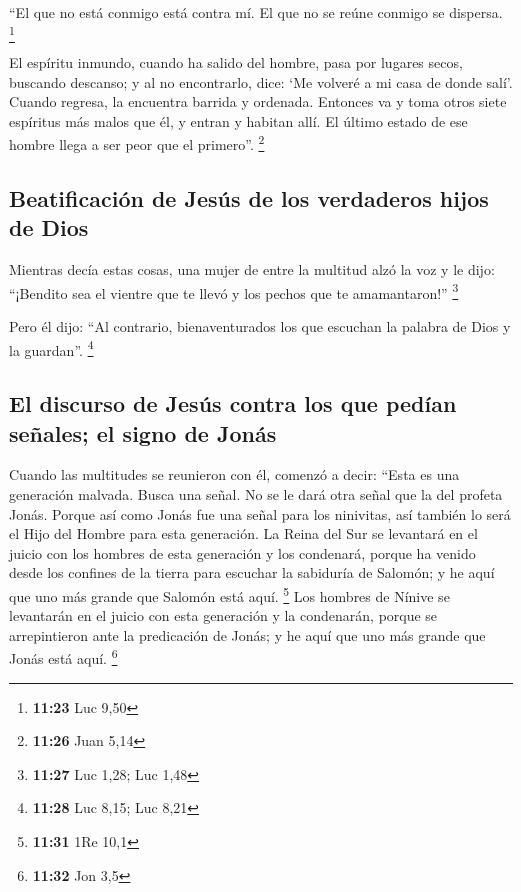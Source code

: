  ``El que no está conmigo está contra mí. El que no se
reúne conmigo se dispersa. \footnote{\textbf{11:23} Luc 9,50}

 El espíritu inmundo, cuando ha salido del hombre, pasa
por lugares secos, buscando descanso; y al no encontrarlo, dice: `Me
volveré a mi casa de donde salí'.  Cuando regresa, la
encuentra barrida y ordenada.  Entonces va y toma otros
siete espíritus más malos que él, y entran y habitan allí. El último
estado de ese hombre llega a ser peor que el primero''. \footnote{\textbf{11:26}
  Juan 5,14}

\hypertarget{beatificaciuxf3n-de-jesuxfas-de-los-verdaderos-hijos-de-dios}{%
\subsection{Beatificación de Jesús de los verdaderos hijos de
Dios}\label{beatificaciuxf3n-de-jesuxfas-de-los-verdaderos-hijos-de-dios}}

 Mientras decía estas cosas, una mujer de entre la
multitud alzó la voz y le dijo: ``¡Bendito sea el vientre que te llevó y
los pechos que te amamantaron!'' \footnote{\textbf{11:27} Luc 1,28; Luc
  1,48}

 Pero él dijo: ``Al contrario, bienaventurados los que
escuchan la palabra de Dios y la guardan''. \footnote{\textbf{11:28} Luc
  8,15; Luc 8,21}

\hypertarget{el-discurso-de-jesuxfas-contra-los-que-peduxedan-seuxf1ales-el-signo-de-jonuxe1s}{%
\subsection{El discurso de Jesús contra los que pedían señales; el signo
de
Jonás}\label{el-discurso-de-jesuxfas-contra-los-que-peduxedan-seuxf1ales-el-signo-de-jonuxe1s}}

 Cuando las multitudes se reunieron con él, comenzó a
decir: ``Esta es una generación malvada. Busca una señal. No se le dará
otra señal que la del profeta Jonás.  Porque así como
Jonás fue una señal para los ninivitas, así también lo será el Hijo del
Hombre para esta generación.  La Reina del Sur se
levantará en el juicio con los hombres de esta generación y los
condenará, porque ha venido desde los confines de la tierra para
escuchar la sabiduría de Salomón; y he aquí que uno más grande que
Salomón está aquí. \footnote{\textbf{11:31} 1Re 10,1} 
Los hombres de Nínive se levantarán en el juicio con esta generación y
la condenarán, porque se arrepintieron ante la predicación de Jonás; y
he aquí que uno más grande que Jonás está aquí. \footnote{\textbf{11:32}
  Jon 3,5}

